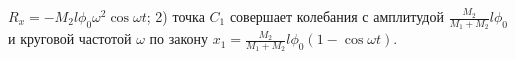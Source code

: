 $R_{x}=-M_{2}l\phi_{0}\omega^2\cos \omega t$; 2) точка $C_{1}$ совершает колебания с амплитудой $\frac{M_{2}}{M_{1}+M_{2}}l\phi_{0}$ и круговой частотой $\omega$ по закону 
$x_{1}=\frac{M_{2}}{M_{1}+M_{2}}l\phi_{0}(1-\cos \omega t)$.
